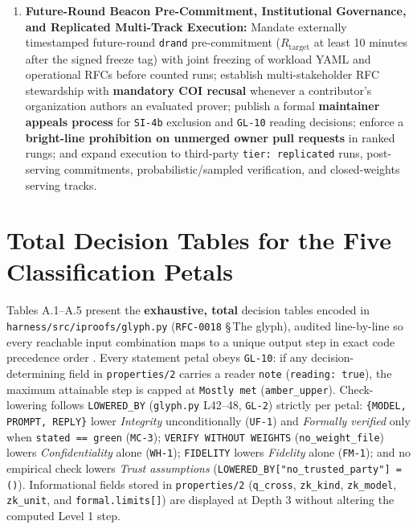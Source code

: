 \documentclass[11pt,letterpaper]{article}
\begin{document}
\begin{enumerate}
\item \textbf{Future-Round Beacon Pre-Commitment, Institutional Governance, and Replicated Multi-Track Execution:} Mandate externally timestamped future-round \texttt{drand} pre-commitment ($R_{\text{target}}$ at least 10 minutes after the signed freeze tag) with joint freezing of workload YAML and operational RFCs before counted runs; establish multi-stakeholder RFC stewardship with \textbf{mandatory COI recusal} whenever a contributor's organization authors an evaluated prover; publish a formal \textbf{maintainer appeals process} for \texttt{SI-4b} exclusion and \texttt{GL-10} reading decisions; enforce a \textbf{bright-line prohibition on unmerged owner pull requests} in ranked rungs; and expand execution to third-party \texttt{tier: replicated} runs, post-serving commitments, probabilistic/sampled verification, and closed-weights serving tracks.
\end{enumerate}

\appendix
{}

\section{Total Decision Tables for the Five Classification Petals}

Tables A.1--A.5 present the \textbf{exhaustive, total} decision tables encoded in \texttt{harness/\allowbreak{}src/\allowbreak{}iproofs/\allowbreak{}glyph.\allowbreak{}py} (\texttt{RFC-0018} \S\,The glyph), audited line-by-line so every reachable input combination maps to a unique output step in exact code precedence order \cite{iproofs2026}. Every statement petal obeys \texttt{GL-10}: if any decision-determining field in \texttt{properties/\allowbreak{}2} carries a reader \texttt{note} (\texttt{reading: true}), the maximum attainable step is capped at \texttt{Mostly met} (\texttt{amber\_\allowbreak{}upper}). Check-lowering follows \texttt{LOWERED\_\allowbreak{}BY} (\texttt{glyph.\allowbreak{}py} L42--48, \texttt{GL-2}) strictly per petal: \texttt{\{MODEL, PROMPT, REPLY\}} lower \textit{Integrity} unconditionally (\texttt{UF-1}) and \textit{Formally verified} only when \texttt{stated == green} (\texttt{MC-3}); \texttt{VERIFY WITHOUT WEIGHTS} (\texttt{no\_\allowbreak{}weight\_\allowbreak{}file}) lowers \textit{Confidentiality} alone (\texttt{WH-1}); \texttt{FIDELITY} lowers \textit{Fidelity} alone (\texttt{FM-1}); and no empirical check lowers \textit{Trust assumptions} (\texttt{LOWERED\_\allowbreak{}BY["no\_\allowbreak{}trusted\_\allowbreak{}party"] = ()}). Informational fields stored in \texttt{properties/\allowbreak{}2} (\texttt{q\_\allowbreak{}cross}, \texttt{zk\_\allowbreak{}kind}, \texttt{zk\_\allowbreak{}model}, \texttt{zk\_\allowbreak{}unit}, and \texttt{formal.\allowbreak{}limits[]}) are displayed at Depth 3 without altering the computed Level 1 step.
\end{document}
